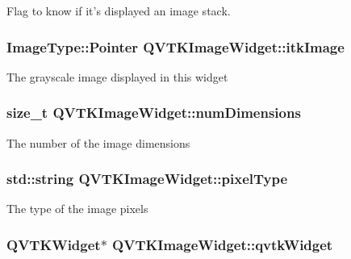 Flag to know if it's displayed an image stack. 

\hypertarget{class_q_v_t_k_image_widget_ae5b308466d4f198990b9d132319f9f34}{
\subsubsection[{itk\-Image}]{\setlength{\rightskip}{0pt plus 5cm}Image\-Type\-::\-Pointer {\bf Q\-V\-T\-K\-Image\-Widget\-::itk\-Image}}}\label{d8/dd7/class_q_v_t_k_image_widget_ae5b308466d4f198990b9d132319f9f34}
The grayscale image displayed in this widget \hypertarget{class_q_v_t_k_image_widget_a6aff403421ea538248d48116a942271b}{
\subsubsection[{num\-Dimensions}]{\setlength{\rightskip}{0pt plus 5cm}size\-\_\-t {\bf Q\-V\-T\-K\-Image\-Widget\-::num\-Dimensions}}}\label{d8/dd7/class_q_v_t_k_image_widget_a6aff403421ea538248d48116a942271b}
The number of the image dimensions \hypertarget{class_q_v_t_k_image_widget_a067b78e68ed458d840ad1cf0d16b4ad6}{
\subsubsection[{pixel\-Type}]{\setlength{\rightskip}{0pt plus 5cm}std\-::string {\bf Q\-V\-T\-K\-Image\-Widget\-::pixel\-Type}}}\label{d8/dd7/class_q_v_t_k_image_widget_a067b78e68ed458d840ad1cf0d16b4ad6}
The type of the image pixels \hypertarget{class_q_v_t_k_image_widget_a461f6ca20211ec9ff4b367aeb95e8139}{
\subsubsection[{qvtk\-Widget}]{\setlength{\rightskip}{0pt plus 5cm}Q\-V\-T\-K\-Widget$\ast$ {\bf Q\-V\-T\-K\-Image\-Widget\-::qvtk\-Widget}}}\label{d8/dd7/class_q_v_t_k_image_widget_a461f6ca20211ec9ff4b367aeb95e8139}
